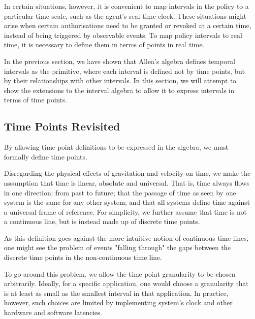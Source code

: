 \documentclass[11pt]{report}
\begin{document}
      In certain situations, however, it is convenient to map intervals in the
      policy to a particular time scale, such as the agent's real time clock.
      These situations might arise when certain authorisations need to be
      granted or revoked at a certain time, instead of being triggered by
      observable events. To map policy intervals to real time, it is necessary
      to define them in terms of points in real time.

      In the previous section, we have shown that Allen's algebra defines
      temporal intervals as the primitive, where each interval is defined not
      by time points, but by their relationships with other intervals. In this
      section, we will attempt to show the extensions to the interval algebra
      to allow it to express intervals in terms of time points.

      \subsection{Time Points Revisited}
        \label{subs-tempo-tprev}

        By allowing time point definitions to be expressed in the algebra, we must
        formally define time points.

        Disregarding the physical effects of gravitation and velocity on time, we
        make the assumption that time is linear, absolute and universal. That is,
        time always flows in one direction: from past to future; that the passage of
        time as seen by one system is the same for any other system; and that all
        systems define time against a universal frame of reference. For simplicity,
        we further assume that time is not a continuous line, but is instead made up
        of discrete time points.

        As this definition goes against the more intuitive notion of continuous time
        lines, one might see the problem of events "falling through" the gaps
        between the discrete time points in the non-continuous time line.

        To go around this problem, we allow the time point granularity to be chosen
        arbitrarily. Ideally, for a specific application, one would choose a
        granularity that is at least as small as the smallest interval in that
        application. In practice, however, such choices are limited by implementing
        system's clock and other hardware and software latencies.
\end{document}
